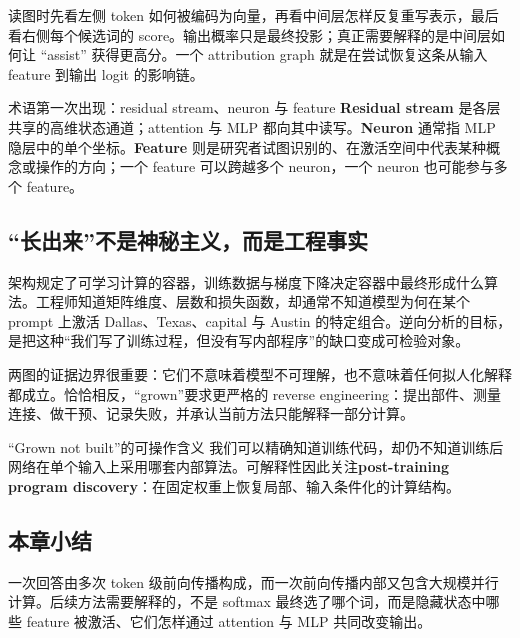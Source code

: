 
读图时先看左侧 token 如何被编码为向量，再看中间层怎样反复重写表示，最后看右侧每个候选词的 score。输出概率只是最终投影；真正需要解释的是中间层如何让 “assist” 获得更高分。一个 attribution graph 就是在尝试恢复这条从输入 feature 到输出 logit 的影响链。

\begin{knowledgebox}{术语第一次出现：residual stream、neuron 与 feature}
\textbf{Residual stream} 是各层共享的高维状态通道；attention 与 MLP 都向其中读写。\textbf{Neuron} 通常指 MLP 隐层中的单个坐标。\textbf{Feature} 则是研究者试图识别的、在激活空间中代表某种概念或操作的方向；一个 feature 可以跨越多个 neuron，一个 neuron 也可能参与多个 feature。
\end{knowledgebox}

\subsection{“长出来”不是神秘主义，而是工程事实}

架构规定了可学习计算的容器，训练数据与梯度下降决定容器中最终形成什么算法。工程师知道矩阵维度、层数和损失函数，却通常不知道模型为何在某个 prompt 上激活 Dallas、Texas、capital 与 Austin 的特定组合。逆向分析的目标，是把这种“我们写了训练过程，但没有写内部程序”的缺口变成可检验对象。



两图的证据边界很重要：它们不意味着模型不可理解，也不意味着任何拟人化解释都成立。恰恰相反，“grown”要求更严格的 reverse engineering：提出部件、测量连接、做干预、记录失败，并承认当前方法只能解释一部分计算。

\begin{importantbox}{“Grown not built”的可操作含义}
我们可以精确知道训练代码，却仍不知道训练后网络在单个输入上采用哪套内部算法。可解释性因此关注\textbf{post-training program discovery}：在固定权重上恢复局部、输入条件化的计算结构。
\end{importantbox}


\subsection{本章小结}

一次回答由多次 token 级前向传播构成，而一次前向传播内部又包含大规模并行计算。后续方法需要解释的，不是 softmax 最终选了哪个词，而是隐藏状态中哪些 feature 被激活、它们怎样通过 attention 与 MLP 共同改变输出。

